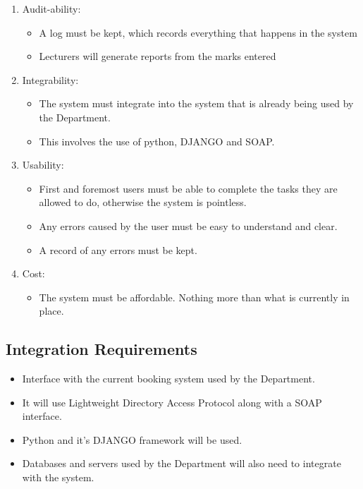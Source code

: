 \begin{enumerate}
\begin{itemize}
\end{itemize}
\item Audit-ability:
\begin{itemize}
\item A log must be kept, which records everything that happens in the system
\item Lecturers will generate reports from the marks entered
\end{itemize}
\item Integrability:
\begin{itemize}
\item The system must integrate into the system that is already being used by the Department.
\item This involves the use of python, DJANGO and SOAP.
\end{itemize}
\item Usability:
\begin{itemize}
\item First and foremost users must be able to complete the tasks they are allowed to do, otherwise the system is pointless.
\item Any errors caused by the user must be easy to understand and clear.
\item A record of any errors must be kept.
\end{itemize}
\item Cost:
\begin{itemize}
\item The system must be affordable. Nothing more than what is currently in place.
\end{itemize}
\end{enumerate}

\subsection{Integration Requirements}

\begin{itemize}

\item Interface with the current booking system used by the Department.
\item It will use Lightweight Directory Access Protocol along with a SOAP interface.
\item Python and it's DJANGO framework will be used.
\item Databases and servers used by the Department will also need to integrate with the system.

\end{itemize}

